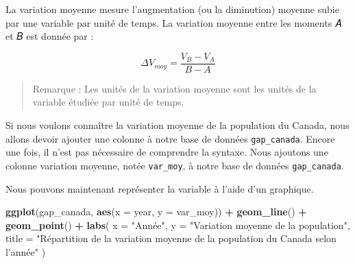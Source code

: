 \documentclass[]{book}
\newenvironment{Shaded}{\begin{snugshade}}{\end{snugshade}}
\newcommand{\KeywordTok}[1]{\textcolor[rgb]{0.13,0.29,0.53}{\textbf{#1}}}
\newcommand{\DataTypeTok}[1]{\textcolor[rgb]{0.13,0.29,0.53}{#1}}
\newcommand{\StringTok}[1]{\textcolor[rgb]{0.31,0.60,0.02}{#1}}
\newcommand{\OperatorTok}[1]{\textcolor[rgb]{0.81,0.36,0.00}{\textbf{#1}}}
\newcommand{\NormalTok}[1]{#1}
\begin{document}
La variation moyenne mesure l'augmentation (ou la diminution) moyenne
subie par une variable par unité de temps. La variation moyenne entre
les moments 𝐴 et 𝐵 est donnée par :

\begin{equation}
\Delta V_{moy} = \dfrac{V_B - V_A}{B-A}
\end{equation}

\begin{quote}
Remarque : Les unités de la variation moyenne sont les unités de la
variable étudiée par unité de temps.
\end{quote}

Si nous voulons connaître la variation moyenne de la population du
Canada, nous allons devoir ajouter une colonne à notre base de données
\texttt{gap\_canada}. Encore une fois, il n'est pas nécessaire de
comprendre la syntaxe. Nous ajoutons une colonne variation moyenne,
notée \texttt{var\_moy}, à notre base de données \texttt{gap\_canada}.

\begin{Shaded}
\end{Shaded}

Nous pouvons maintenant représenter la variable à l'aide d'un graphique.

\begin{Shaded}
\begin{Highlighting}[]
\KeywordTok{ggplot}\NormalTok{(gap_canada, }\KeywordTok{aes}\NormalTok{(}\DataTypeTok{x =}\NormalTok{ year, }\DataTypeTok{y =}\NormalTok{ var_moy)) }\OperatorTok{+}
\StringTok{  }\KeywordTok{geom_line}\NormalTok{() }\OperatorTok{+}
\StringTok{  }\KeywordTok{geom_point}\NormalTok{() }\OperatorTok{+}
\StringTok{  }\KeywordTok{labs}\NormalTok{(}
    \DataTypeTok{x =} \StringTok{"Année"}\NormalTok{,}
    \DataTypeTok{y =} \StringTok{"Variation moyenne de la population"}\NormalTok{,}
    \DataTypeTok{title =} \StringTok{"Répartition de la variation moyenne de la population du Canada selon l'année"}
\NormalTok{  )}
\end{Highlighting}
\end{Shaded}
\end{document}
